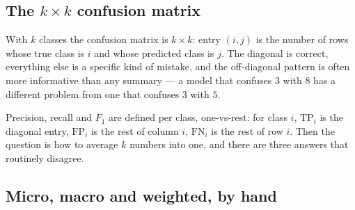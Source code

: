 \documentclass[11pt]{article}
\newcommand{\TP}{\mathrm{TP}}
\newcommand{\FP}{\mathrm{FP}}
\newcommand{\FN}{\mathrm{FN}}
\begin{document}
\subsection{The $k \times k$ confusion matrix}

With $k$ classes the confusion matrix is $k \times k$: entry $(i, j)$ is the
number of rows whose true class is $i$ and whose predicted class is $j$. The
diagonal is correct, everything else is a specific kind of mistake, and the
off-diagonal pattern is often more informative than any summary --- a model that
confuses $3$ with $8$ has a different problem from one that confuses $3$ with
$5$.

Precision, recall and $F_1$ are defined per class, one-vs-rest: for class $i$,
$\TP_i$ is the diagonal entry, $\FP_i$ is the rest of column $i$, $\FN_i$ is the
rest of row $i$. Then the question is how to average $k$ numbers into one, and
there are three answers that routinely disagree.

\subsection{Micro, macro and weighted, by hand}
\end{document}
